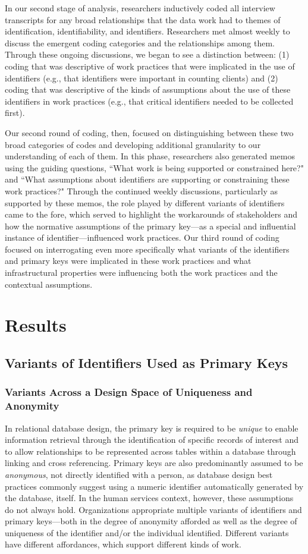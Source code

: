 In our second stage of analysis, researchers inductively coded all interview transcripts for any broad relationships that the data work had to themes of identification, identifiability, and identifiers. Researchers met almost weekly to discuss the emergent coding categories and the relationships among them. Through these ongoing discussions, we began to see a distinction between: (1) coding that was descriptive of work practices that were implicated in the use of identifiers (e.g., that identifiers were important in counting clients) and (2) coding that was descriptive of the kinds of assumptions about the use of these identifiers in work practices (e.g., that critical identifiers needed to be collected first). 

Our second round of coding, then, focused on distinguishing between these two broad categories of codes and developing additional granularity to our understanding of each of them. In this phase, researchers also generated memos using the guiding questions, ``What work is being supported or constrained here?" and ``What assumptions about identifiers are supporting or constraining these work practices?" Through the continued weekly discussions, particularly as supported by these memos, the role played by different variants of identifiers came to the fore, which served to highlight the workarounds of stakeholders and how the normative assumptions of the primary key---as a special and influential instance of identifier---influenced work practices. Our third round of coding focused on interrogating even more specifically what variants of the identifiers and primary keys were implicated in these work practices and what infrastructural properties were influencing both the work practices and the contextual assumptions.

\section{Results}
\subsection{Variants of Identifiers Used as Primary Keys}
\subsubsection{Variants Across a Design Space of Uniqueness and Anonymity}
In relational database design, the primary key is required to be \textit{unique} to enable information retrieval through the identification of specific records of interest and to allow relationships to be represented across tables within a database through linking and cross referencing. Primary keys are also predominantly assumed to be \textit{anonymous}, not directly identified with a person, as database design best practices commonly suggest using a numeric identifier automatically generated by the database, itself. In the human services context, however, these assumptions do not always hold. Organizations appropriate multiple variants of identifiers and primary keys---both in the degree of anonymity afforded as well as the degree of uniqueness of the identifier and/or the individual identified. Different variants have different affordances, which support different kinds of work. 

